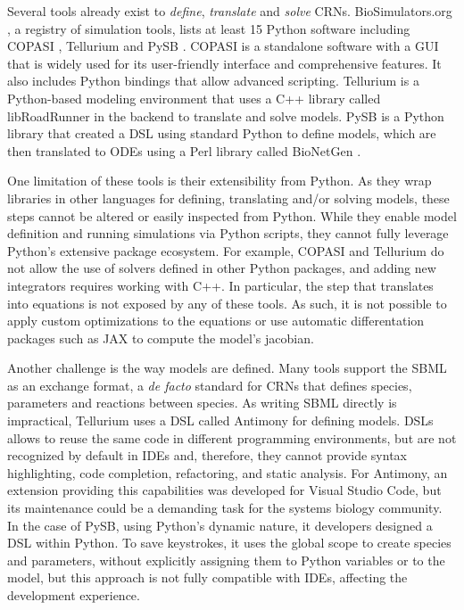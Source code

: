 \documentclass{article}
\begin{document}
Several tools already exist to \emph{define}, \emph{translate} and \emph{solve} \acp{CRN}.
BioSimulators.org \cite{shaikhBioSimulatorsCentralRegistry2022},
a registry of simulation tools,
lists at least 15 Python software including
COPASI \cite{hoopsCOPASICOmplexPAthway2006},
Tellurium \cite{choiTelluriumExtensiblePythonbased2018} and
PySB \cite{lopezProgrammingBiologicalModels2013}.
COPASI is a standalone software with a \ac{GUI}
that is widely used for its user-friendly interface and comprehensive features.
It also includes Python bindings \cite{bergmannBASICOSimplifiedPython2023b} that allow advanced scripting.
Tellurium is a Python-based modeling environment
that uses a C++ library called libRoadRunner in the backend to translate and solve models.
PySB is a Python library that created a \ac{DSL} using standard Python to define models,
which are then translated to \acp{ODE} using a Perl library called BioNetGen \cite{harrisBioNetGenAdvancesRulebased2016}.

One limitation of these tools is their extensibility from Python.
As they wrap libraries in other languages for defining, translating and/or solving models,
these steps cannot be altered or easily inspected from Python.
While they enable model definition and running simulations via Python scripts,
they cannot fully leverage Python's extensive package ecosystem.
For example,
COPASI and Tellurium do not allow the use of solvers defined in other Python packages,
and adding new integrators requires working with C++.
In particular, the step that translates into equations is not exposed by any of these tools.
As such, it is not possible to apply custom optimizations to the equations
or use automatic differentation packages such as JAX \cite{jax2018github} to compute the model's jacobian.

Another challenge is the way models are defined.
Many tools support the \ac{SBML} \cite{huckaSBMLL3V2} as an exchange format,
a \emph{de facto} standard for \acp{CRN} that defines species, parameters and reactions between species.
As writing \ac{SBML} directly is impractical,
Tellurium uses a \ac{DSL} called Antimony \cite{smithAntimonyModularModel2009} for defining models.
\Acp{DSL} allows to reuse the same code in different programming environments,
but are not recognized by default in \acp{IDE}
and, therefore, they cannot provide syntax highlighting, code completion, refactoring, and static analysis.
For Antimony, an extension providing this capabilities was developed for Visual Studio Code,
but its maintenance could be a demanding task for the systems biology community.
In the case of PySB,
using Python's dynamic nature,
it developers designed a \ac{DSL} within Python.
To save keystrokes,
it uses the global scope to create species and parameters,
without explicitly assigning them to Python variables or to the model,
but this approach is not fully compatible with \acp{IDE},
affecting the development experience.
\end{document}

